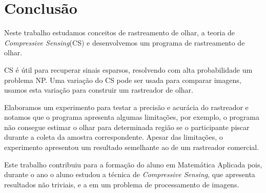\chapter{Conclusão}

Neste trabalho estudamos conceitos de rastreamento de olhar, a teoria de \textit{Compressive Sensing}(CS) e desenvolvemos um programa de rastreamento de olhar.


CS é útil para recuperar sinais esparsos, resolvendo com alta probabilidade um problema NP. Uma variação do CS pode ser usada para comparar imagens, usamos esta variação para construir um rastreador de olhar.

Elaboramos um experimento para testar a precisão e acurácia do rastreador e notamos que o programa apresenta algumas limitações, por exemplo, o programa não consegue estimar o olhar para determinada região se o participante piscar durante a coleta da amostra correspondente. Apesar das limitações, o experimento apresentou um resultado semelhante ao de um rastreador comercial.

Este trabalho contribuiu para a formação do aluno em Matemática Aplicada pois, durante o ano o aluno estudou a técnica de \textit{Compressive Sensing}, que apresenta resultados não triviais, e a  em um problema de processamento de imagens.
